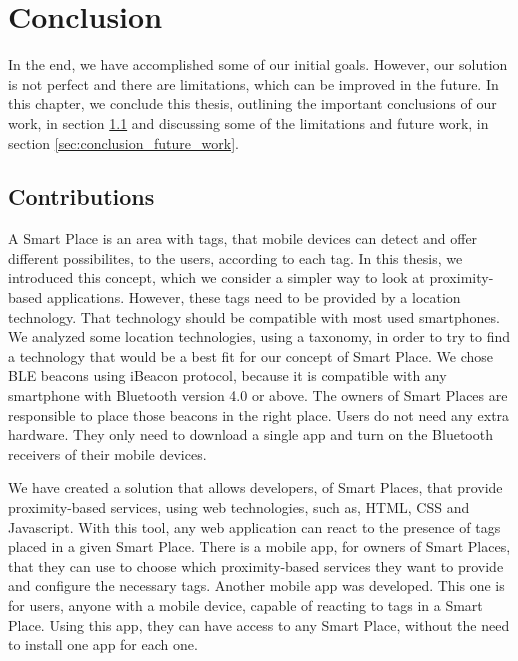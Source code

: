 
\section{Conclusion}
\label{sec:conclusion}
In the end, we have accomplished some of our initial goals.
However, our solution is not perfect and there are limitations, which can be improved in the future.
In this chapter, we conclude this thesis, outlining the important conclusions of our work, in section \ref{sec:conclusion_contributions} and discussing some of the limitations and future work, in section \ref{sec:conclusion_future_work}.

\subsection{Contributions}
\label{sec:conclusion_contributions}
A Smart Place is an area with tags, that mobile devices can detect and offer different possibilites, to the users, according to each tag.
In this thesis, we introduced this concept, which we consider a simpler way to look at proximity-based applications.
However, these tags need to be provided by a location technology.
That technology should be compatible with most used smartphones.
We analyzed some location technologies, using a taxonomy\cite{location}, in order to try to find a technology that would be a best fit for our concept of Smart Place.
We chose \gls{BLE} beacons using iBeacon protocol, because it is compatible with any smartphone with Bluetooth version 4.0 or above.
The owners of Smart Places are responsible to place those beacons in the right place.
Users do not need any extra hardware.
They only need to download a single app and turn on the Bluetooth receivers of their mobile devices.

We have created a solution that allows developers, of Smart Places, that provide proximity-based services, using web technologies, such as, \gls{HTML}, \gls{CSS} and Javascript.
With this tool, any web application can react to the presence of tags placed in a given Smart Place.
There is a mobile app, for owners of Smart Places, that they can use to choose which proximity-based services they want to provide and configure the necessary tags.
Another mobile app was developed.
This one is for users, anyone with a mobile device, capable of reacting to tags in a Smart Place.
Using this app, they can have access to any Smart Place, without the need to install one app for each one.

